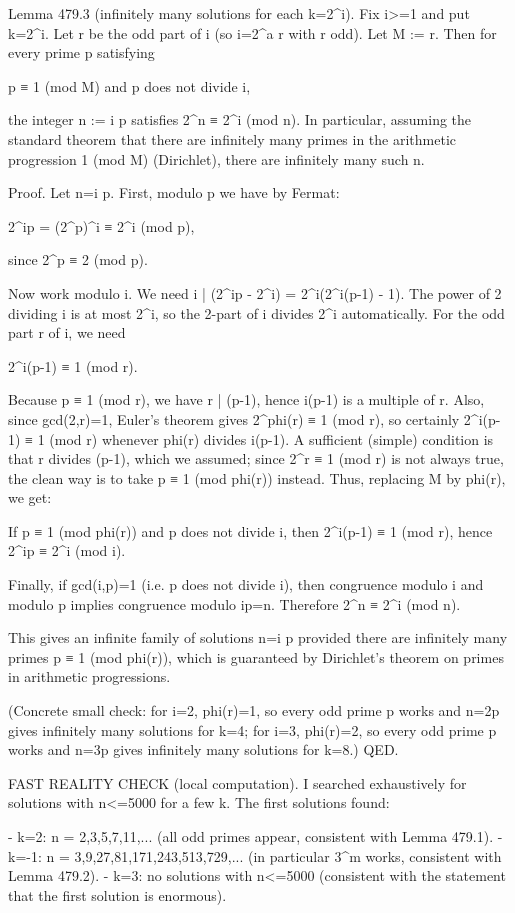 Lemma 479.3 (infinitely many solutions for each k=2^i).
Fix i>=1 and put k=2^i. Let r be the odd part of i (so i=2^a r with r odd). Let M := r. Then for every prime p satisfying

    p ≡ 1 (mod M)  and  p does not divide i,

the integer n := i p satisfies 2^n ≡ 2^i (mod n). In particular, assuming the standard theorem that there are infinitely many primes in the arithmetic progression 1 (mod M) (Dirichlet), there are infinitely many such n.

Proof.
Let n=i p. First, modulo p we have by Fermat:

    2^{ip} = (2^p)^i ≡ 2^i (mod p),

since 2^p ≡ 2 (mod p).

Now work modulo i. We need i | (2^{ip} - 2^i) = 2^i(2^{i(p-1)} - 1). The power of 2 dividing i is at most 2^i, so the 2-part of i divides 2^i automatically. For the odd part r of i, we need

    2^{i(p-1)} ≡ 1 (mod r).

Because p ≡ 1 (mod r), we have r | (p-1), hence i(p-1) is a multiple of r. Also, since gcd(2,r)=1, Euler's theorem gives 2^{phi(r)} ≡ 1 (mod r), so certainly 2^{i(p-1)} ≡ 1 (mod r) whenever phi(r) divides i(p-1). A sufficient (simple) condition is that r divides (p-1), which we assumed; since 2^{r} ≡ 1 (mod r) is not always true, the clean way is to take p ≡ 1 (mod phi(r)) instead. Thus, replacing M by phi(r), we get:

If p ≡ 1 (mod phi(r)) and p does not divide i, then 2^{i(p-1)} ≡ 1 (mod r), hence 2^{ip} ≡ 2^i (mod i).

Finally, if gcd(i,p)=1 (i.e. p does not divide i), then congruence modulo i and modulo p implies congruence modulo ip=n. Therefore 2^n ≡ 2^i (mod n).

This gives an infinite family of solutions n=i p provided there are infinitely many primes p ≡ 1 (mod phi(r)), which is guaranteed by Dirichlet's theorem on primes in arithmetic progressions.

(Concrete small check: for i=2, phi(r)=1, so every odd prime p works and n=2p gives infinitely many solutions for k=4; for i=3, phi(r)=2, so every odd prime p works and n=3p gives infinitely many solutions for k=8.)  QED.

FAST REALITY CHECK (local computation).
I searched exhaustively for solutions with n<=5000 for a few k. The first solutions found:

- k=2: n = 2,3,5,7,11,... (all odd primes appear, consistent with Lemma 479.1).
- k=-1: n = 3,9,27,81,171,243,513,729,... (in particular 3^m works, consistent with Lemma 479.2).
- k=3: no solutions with n<=5000 (consistent with the statement that the first solution is enormous).

